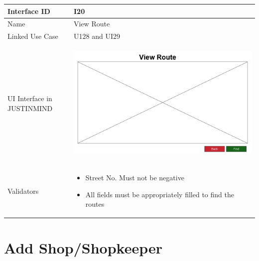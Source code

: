 \documentclass[12pt,a4paper]{report}
\begin{document}
\begin{tabular}{ | m{3cm} | m{12cm}| } \hline

Interface ID & I20  \\\hline

Name  & View Route  \\ \hline

Linked Use Case & U128 and UI29  \\ \hline

UI Interface in JUSTINMIND & \begin{center} \includegraphics[scale=0.3]{./User Interface/UI-034 Route Finder@1x.png}\end{center}  \\ \hline

Validators & 
\begin{itemize}
\item  Street No. Must not be negative
\item All fields must be appropriately filled to find the routes
 \end{itemize}
 \\ \hline
\end{tabular} 

\section{Add Shop/Shopkeeper}
\end{document}
